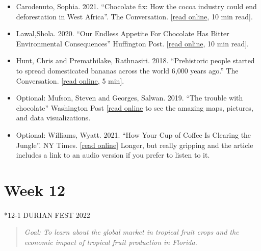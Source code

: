 \documentclass[
  10pt,
  letterpaper,
  oneside,
  open=any]{scrbook}
\makeatletter
\let\oldparagraph\paragraph
\renewcommand{\paragraph}{
    \@ifstar
      \xxxParagraphStar
      \xxxParagraphNoStar
  }
\newcommand{\xxxParagraphStar}[1]{\oldparagraph*{#1}\mbox{}}
\newcommand{\xxxParagraphNoStar}[1]{\oldparagraph{#1}\mbox{}}
\makeatother
\begin{document}
\begin{itemize}
\item
  Carodenuto, Sophia. 2021. ``Chocolate fix: How the cocoa industry
  could end deforestation in West Africa''. The Conversation.
  {[}\href{https://theconversation.com/chocolate-fix-how-the-cocoa-industry-could-end-deforestation-in-west-africa-161953}{read
  online}, 10 min read{]}.
\item
  Lawal,Shola. 2020. ``Our Endless Appetite For Chocolate Has Bitter
  Environmental Consequences'' Huffington Post.
  {[}\href{https://tinyurl.com/y6curgmn}{read online}, 10 min read{]}.
\item
  Hunt, Chris and Premathilake, Rathnasiri. 2018. ``Prehistoric people
  started to spread domesticated bananas across the world 6,000 years
  ago.'' The Conversation.
  {[}\href{https://theconversation.com/prehistoric-people-started-to-spread-domesticated-bananas-across-the-world-6-000-years-ago-99547}{read
  online}, 5 min{]}.
\item
  Optional: Mufson, Steven and Georges, Salwan. 2019. ``The trouble with
  chocolate'' Washington Post
  {[}\href{https://www.washingtonpost.com/graphics/2019/national/climate-environment/mars-chocolate-deforestation-climate-change-west-africa/}{read
  online} to see the amazing maps, pictures, and data visualizations.
\item
  Optional: Williams, Wyatt. 2021. ``How Your Cup of Coffee Is Clearing
  the Jungle''. NY Times.
  {[}\href{https://www.nytimes.com/2021/08/11/magazine/indonesia-rainforest-coffee.html}{read
  online}{]} Longer, but really gripping and the article includes a link
  to an audio version if you prefer to listen to it.
\end{itemize}

\section*{Week 12}\label{week-12}


\paragraph*{12-1 DURIAN FEST 2022}\label{durian-fest-2022}

\begin{quote}
\emph{Goal: To learn about the global market in tropical fruit crops and
the economic impact of tropical fruit production in Florida.}
\end{quote}
\end{document}
